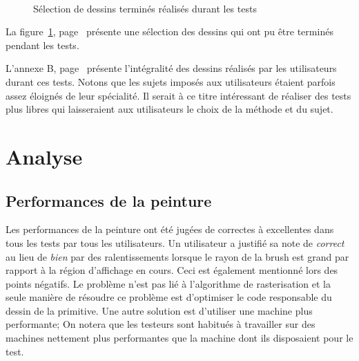 \begin{figure}[h]
		\\
		\caption{Sélection de dessins terminés réalisés durant les tests}
		\label{fig:paintings}
	\end{figure}
	La figure~\ref{fig:paintings}, page~\pageref{fig:paintings} présente une sélection des dessins qui ont pu être terminés pendant les tests.
	
	L'annexe B, page~\pageref{annexb} présente l'intégralité des dessins réalisés par les utilisateurs durant ces tests. Notons que les sujets 
	imposés aux utilisateurs étaient parfois assez éloignés de leur spécialité. Il serait à ce titre intéressant de réaliser des tests plus libres
	qui laisseraient aux utilisateurs le choix de la méthode et du sujet. 
	
	\section{Analyse}
		\subsection{Performances de la peinture}
		Les performances de la peinture ont été jugées de correctes à excellentes dans tous les tests par tous les utilisateurs. Un utilisateur
		a justifié sa note de \emph{correct} au lieu de \emph{bien} par des ralentissements lorsque le rayon de la brush est grand par rapport
		à la région d'affichage en cours. Ceci est également mentionné lors des points négatifs. 
		Le problème n'est pas lié à l'algorithme de rasterisation et la seule manière de résoudre ce problème est 
		d'optimiser le code responsable du dessin de la primitive. Une autre solution est d'utiliser une machine plus performante; On notera
		que les testeurs sont habitués à travailler sur des machines nettement plus performantes que la machine dont ils
		disposaient pour le test. 

